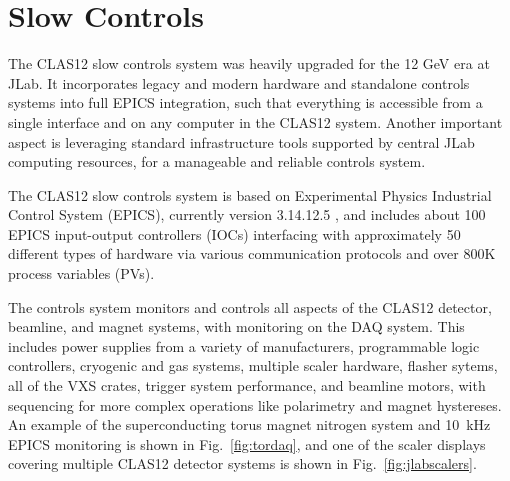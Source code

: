 \section{Slow Controls}

The CLAS12 slow controls system was heavily upgraded for the 12 GeV era at JLab.  It incorporates legacy and modern hardware and standalone controls systems into full EPICS integration, such that everything is accessible from a single interface and on any computer in the CLAS12 system.  Another important aspect is leveraging standard infrastructure tools supported by central JLab computing resources, for a manageable and reliable controls system.

The CLAS12 slow controls system is based on Experimental Physics Industrial Control System (EPICS), currently version 3.14.12.5 \cite{epics-website}, and includes about 100 EPICS input-output controllers (IOCs) interfacing with approximately 50 different types of hardware via various communication protocols and over 800K process variables (PVs).

The controls system monitors and controls all aspects of the CLAS12 detector, beamline, and magnet systems, with monitoring on the DAQ system.  This includes power supplies from a variety of manufacturers, programmable logic controllers, cryogenic and gas systems, multiple scaler hardware, flasher sytems, all of the VXS crates, trigger system performance, and beamline motors, with sequencing for more complex operations like polarimetry and magnet hystereses.  An example of the superconducting torus magnet nitrogen system and 10~kHz EPICS monitoring is shown in Fig.~\ref{fig:tordaq}, and one of the scaler displays covering multiple CLAS12 detector systems is shown in Fig.~\ref{fig:jlabscalers}.

